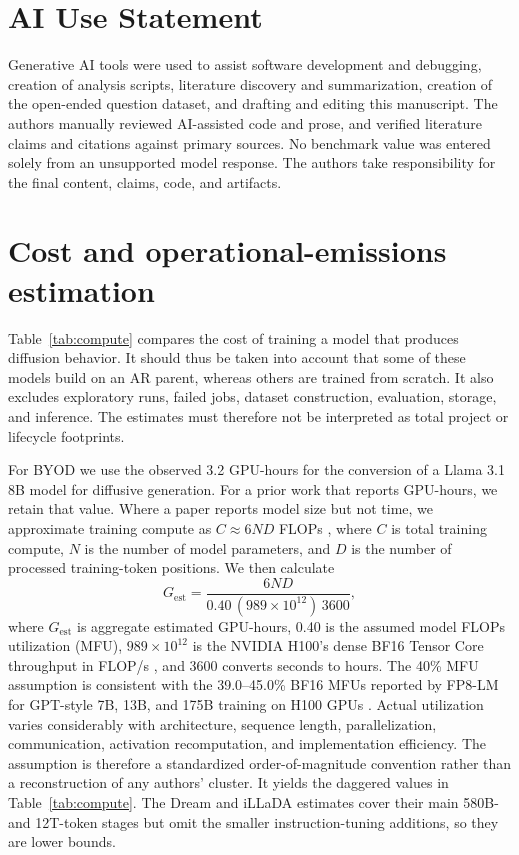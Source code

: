\documentclass{article}
\begin{document}
\section*{AI Use Statement}

Generative AI tools were used to assist software development and debugging, creation of analysis scripts, literature discovery and summarization, creation of the open-ended question dataset, and drafting and editing this manuscript. The authors manually reviewed AI-assisted code and prose, and verified literature claims and citations against primary sources. No benchmark value was entered solely from an unsupported model response. The authors take responsibility for the final content, claims, code, and artifacts.




\appendix
\section{Cost and operational-emissions estimation}
\label{app:cost}

Table~\ref{tab:compute} compares the cost of training a model that produces diffusion behavior. It should thus be taken into account that some of these models build on an AR parent, whereas others are trained from scratch. It also excludes exploratory runs, failed jobs, dataset construction, evaluation, storage, and inference. The estimates must therefore not be interpreted as total project or lifecycle footprints.

For BYOD we use the observed 3.2 GPU-hours for the conversion of a Llama 3.1 8B model for diffusive generation. For a prior work that reports GPU-hours, we retain that value. Where a paper reports model size but not time, we approximate training compute as $C\approx6ND$ FLOPs \citep{hoffmann2022chinchilla}, where $C$ is total training compute, $N$ is the number of model parameters, and $D$ is the number of processed training-token positions. We then calculate
\begin{equation}
G_{\mathrm{est}}=\frac{6ND}{0.40\,(989\times10^{12})\,3600},
\end{equation}
where $G_{\mathrm{est}}$ is aggregate estimated GPU-hours, 0.40 is the assumed model FLOPs utilization (MFU), $989\times10^{12}$ is the NVIDIA H100's dense BF16 Tensor Core throughput in FLOP/s \citep{nvidiaH100}, and 3600 converts seconds to hours. The 40\% MFU assumption is consistent with the 39.0--45.0\% BF16 MFUs reported by FP8-LM for GPT-style 7B, 13B, and 175B training on H100 GPUs \citep{peng2023fp8lm}. Actual utilization varies considerably with architecture, sequence length, parallelization, communication, activation recomputation, and implementation efficiency. The assumption is therefore a standardized order-of-magnitude convention rather than a reconstruction of any authors' cluster. It yields the daggered values in Table~\ref{tab:compute}. The Dream and iLLaDA estimates cover their main 580B- and 12T-token stages but omit the smaller instruction-tuning additions, so they are lower bounds.
\end{document}

